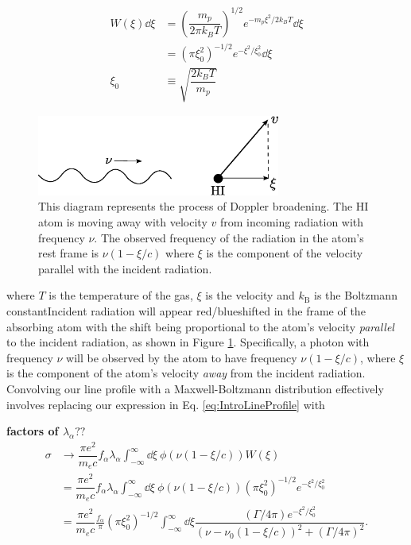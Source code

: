 \begin{align}
W(\xi)\dd \xi &= \left( \dfrac{m_p}{2\pi k_{B}T} \right)^{1/2}e^{-m_p\xi^2/2 k_B T}\dd \xi \\
&= \left(\pi \xi_{0}^{2} \right)^{-1/2} e^{-\xi^{2}/\xi_{0}^{2}} \dd \xi \\
\xi_{0} &\equiv \sqrt{ \dfrac{2k_B T}{m_p}}
\end{align}


\begin{figure}[!p]
  \centering
  \includegraphics[width=8cm]{dopplerDiagram.eps}
  \caption{This diagram represents the process of Doppler broadening. The HI atom is moving away with velocity $v$ from incoming radiation with frequency $\nu$. The observed frequency of the radiation in the atom's rest frame is $\nu(1-\xi/c)$ where $\xi$ is the component of the velocity parallel with the incident radiation. }
  \label{fig:dopplerDiagram}
\end{figure}


where $T$ is the temperature of the gas, $\xi$ is the velocity and $k_{\text{B}}$ is the Boltzmann constantIncident radiation will appear red/blueshifted in the frame of the absorbing atom with the shift being proportional to the atom's velocity \textit{parallel} to the incident radiation, as shown in Figure \ref{fig:dopplerDiagram}. Specifically, a photon with frequency $\nu$ will be observed by the atom to have frequency $\nu(1-\xi/c)$, where $\xi$ is the component of the atom's velocity \textit{away} from the incident radiation. Convolving our line profile with a Maxwell-Boltzmann distribution effectively involves replacing our expression in Eq. \ref{eq:IntroLineProfile} with

{\bf factors of $\lambda_{\alpha}??$}
\begin{align}
\sigma &\to \dfrac{\pi e^2}{m_e c}f_{\alpha}\lambda_{\alpha} \int_{-\infty}^{\infty} \dd \xi\ \phi(\nu(1-\xi/c)) W(\xi)\\
&= \dfrac{\pi e^2}{m_e c}f_{\alpha}\lambda_{\alpha} \int_{-\infty}^{\infty}\dd \xi\ \phi(\nu(1 - \xi/c)) \left(\pi \xi_{0}^{2} \right)^{-1/2} e^{-\xi^2/\xi_{0}^2} \\
&= \dfrac{\pi e^2}{m_e c} \frac{f_{\alpha}}{\pi} \left( \pi \xi_0^2 \right)^{-1/2} \int_{-\infty}^{\infty} \dd \xi \dfrac{(\Gamma/4\pi) e^{-\xi^2/\xi_{0}^{2}}}{(\nu-\nu_{0}(1-\xi/c))^2+(\Gamma/4\pi)^2}. \label{eq:IntroConvolution}
\end{align}


